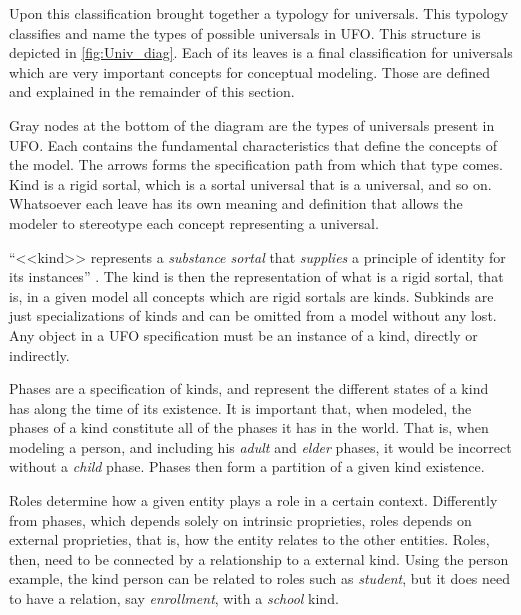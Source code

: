 Upon this classification \citeauthor{guizzardi_ontological_2005} brought together a typology for universals. This typology classifies and name the types of possible universals in UFO. This structure is depicted in \autoref{fig:Univ_diag}. Each of its leaves is a final classification for universals which are very important concepts for conceptual modeling. Those are defined and explained in the remainder of this section.



Gray nodes at the bottom of the diagram are the types of universals present in UFO. Each contains the fundamental characteristics that define the concepts of the model. The arrows forms the specification path from which that type comes. Kind is a rigid sortal, which is a sortal universal that is a universal, and so on. Whatsoever each leave has its own meaning and definition that allows the modeler to stereotype each concept representing a universal.


``<<kind>> represents a \textit{substance sortal} that \textit{supplies} a principle of identity for its instances'' \citep{guizzardi_ontological_2005}. The kind is then the representation of what is a rigid sortal, that is, in a given model all concepts which are rigid sortals are kinds. Subkinds are just specializations of kinds and can be omitted from a model without any lost. Any object in a UFO specification must be an instance of a kind, directly or indirectly.

Phases are a specification of kinds, and represent the different states of a kind has along the time of its existence. It is important that, when modeled, the phases of a kind constitute all of the phases it has in the world. That is, when modeling a person, and including his \textit{adult} and \textit{elder} phases, it would be incorrect without a \textit{child} phase. Phases then form a partition of a given kind existence.

Roles determine how a given entity plays a role in a certain context. Differently from phases, which depends solely on intrinsic proprieties, roles depends on external proprieties, that is, how the entity relates to the other entities. Roles, then, need to be connected by a relationship to a external  kind. Using the person example, the kind person can be related to roles such as \textit{student}, but it does need to have a relation, say \textit{enrollment}, with a \textit{school} kind. 

